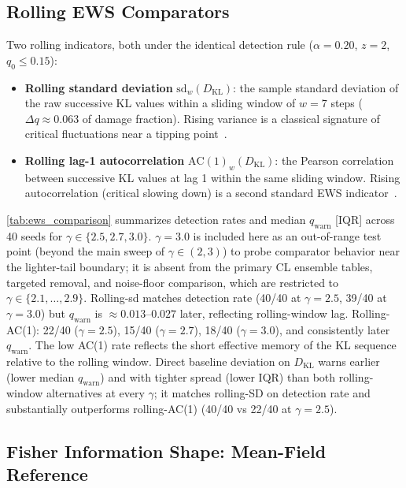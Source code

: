 \documentclass{nws}
\begin{document}
\subsection{Rolling EWS Comparators}
\label{sec:ews_comparators}
Two rolling indicators, both under the identical detection rule
($\alpha=0.20$, $z=2$, $q_0\le0.15$):
\begin{itemize}
    \item \textbf{Rolling standard deviation} $\mathrm{sd}_w(D_{\mathrm{KL}})$: the sample
    standard deviation of the raw successive KL values within a sliding window of $w=7$
    steps ($\Delta q \approx 0.063$ of damage fraction). Rising variance is a classical
    signature of critical fluctuations near a tipping point~\citep{dakos2012methods}.
    \item \textbf{Rolling lag-1 autocorrelation} $\mathrm{AC}(1)_w(D_{\mathrm{KL}})$: the
    Pearson correlation between successive KL values at lag 1 within the same sliding window.
    Rising autocorrelation (critical slowing down) is a second standard EWS
    indicator~\citep{dakos2012methods,vannes2007slow}.
\end{itemize}
\autoref{tab:ews_comparison} summarizes detection rates and median $q_{\mathrm{warn}}$
[IQR] across 40 seeds for $\gamma \in \{2.5, 2.7, 3.0\}$. $\gamma=3.0$ is included here
as an out-of-range test point (beyond the main sweep of $\gamma\in(2,3)$) to probe
comparator behavior near the lighter-tail boundary; it is absent from the primary CL
ensemble tables, targeted removal, and noise-floor comparison, which are restricted
to $\gamma\in\{2.1,\ldots,2.9\}$.
Rolling-sd matches detection rate (40/40 at $\gamma=2.5$, 39/40 at $\gamma=3.0$) but
$q_{\mathrm{warn}}$ is $\approx0.013$--$0.027$ later, reflecting rolling-window lag.
Rolling-AC(1): 22/40 ($\gamma=2.5$), 15/40 ($\gamma=2.7$), 18/40 ($\gamma=3.0$), and
consistently later $q_{\mathrm{warn}}$. The low AC(1) rate reflects the short effective
memory of the KL sequence relative to the rolling window. Direct baseline deviation on $D_{\mathrm{KL}}$ warns earlier (lower median $q_{\mathrm{warn}}$)
and with tighter spread (lower IQR) than both rolling-window alternatives at every $\gamma$;
it matches rolling-SD on detection rate and substantially outperforms rolling-AC(1) (40/40 vs 22/40 at $\gamma=2.5$).



\subsection{Fisher Information Shape: Mean-Field Reference}
\label{sec:analytical_kl}
\end{document}
